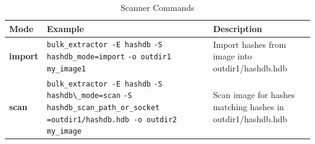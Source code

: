\documentclass[11pt,fleqn]{article} %
\begin{document}
\begin{table}[!ht]
\centering
\caption{\bulk \hash Scanner Commands}
\label{tab:hashdbScanner}
\begin{tabular}{|p{3.5 cm}|p{6 cm}|p{4 cm}|}
\hline \hline
\textbf{Mode} & \textbf{Example} & \textbf{Description} \\
\hline
\textbf{import} & \verb+bulk_extractor -E hashdb+ \verb+-S hashdb_mode=import+ \verb+-o outdir1 my_image1+ & Import hashes from image into outdir1/hashdb.hdb\\
\hline
\textbf{scan} & \verb+bulk_extractor -E hashdb+ \verb+-S hashdb\_mode=scan+ \verb+-S hashdb_scan_path_or_socket+ \verb+=outdir1/hashdb.hdb -o outdir2+ \verb+my_image+ & Scan image for hashes matching hashes in outdir1/hashdb.hdb\\
\hline
\end{tabular}
\end{table}
\end{document}
